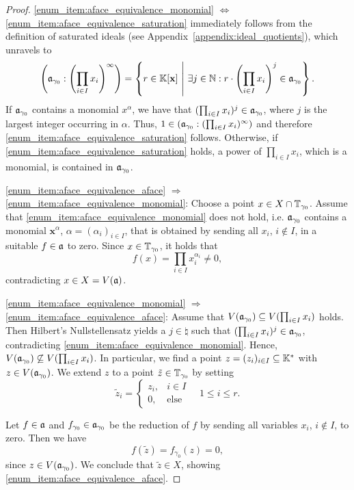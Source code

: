 \begin{proof}
	\ref{enum_item:aface_equivalence_monomial} $\Leftrightarrow$ \ref{enum_item:aface_equivalence_saturation} immediately follows from the definition of saturated ideals (see Appendix~\ref{appendix:ideal_quotients}), which unravels to
	$$\left(\mathfrak{a}_{\gamma_0} : \left(\prod_{i\in I} x_i\right)^\infty\right) = \left\{r\in \mathbb{K}[\mathbf{x}]\ \middle|\ \exists j\in\mathbb{N}: r\cdot \left(\prod_{i\in I} x_i\right)^j \in \mathfrak{a}_{\gamma_0}\right\}.$$
	If $\mathfrak{a}_{\gamma_0}$ contains a monomial $x^\alpha$, we have that $(\prod_{i\in I} x_i)^j\in\mathfrak{a}_{\gamma_0}$, where $j$ is the largest integer occurring in $\alpha$. Thus, $1\in (\mathfrak{a}_{\gamma_0} : (\prod_{i\in I} x_i)^\infty)$ and therefore \ref{enum_item:aface_equivalence_saturation} follows. Otherwise, if \ref{enum_item:aface_equivalence_saturation} holds, a power of $\prod_{i\in I} x_i$, which is a monomial, is contained in $\mathfrak{a}_{\gamma_0}$.
	
	\ref{enum_item:aface_equivalence_aface} $\Rightarrow$ 
	\ref{enum_item:aface_equivalence_monomial}: Choose a point $x\in X\cap \mathbb{T}_{\gamma_0}$. Assume that \ref{enum_item:aface_equivalence_monomial} does not hold, i.e. $\mathfrak{a}_{\gamma_0}$ contains a monomial $\mathbf{x}^\alpha$, $\alpha = (\alpha_i)_{i\in I}$, that is obtained by sending all $x_i$, $i\notin I$, in a suitable $f\in\mathfrak{a}$ to zero.
	Since $x\in\mathbb{T}_{\gamma_0}$, it holds that
	$$f(x) = \prod_{i\in I} x_i^{\alpha_i} \neq 0,$$
	contradicting $x\in X = V(\mathfrak{a})$.
	
	\ref{enum_item:aface_equivalence_monomial} $\Rightarrow$ 
	\ref{enum_item:aface_equivalence_aface}: Assume that $V(\mathfrak{a}_{\gamma_0}) \subseteq V(\prod_{i\in I} x_i)$ holds. Then Hilbert's Nullstellensatz yields a $j\in\natural$ such that $(\prod_{i\in I} x_i)^j\in\mathfrak{a}_{\gamma_0}$, contradicting \ref{enum_item:aface_equivalence_monomial}. Hence, $V(\mathfrak{a}_{\gamma_0}) \not\subseteq V(\prod_{i\in I} x_i)$. In particular, we find a point $z = (z_i)_{i\in I} \subseteq \mathbb{K}^*$ with $z\in V(\mathfrak{a}_{\gamma_0})$. We extend $z$ to a point $\tilde{z}\in\mathbb{T}_{\gamma_0}$ by setting
	$$\tilde{z}_i = \begin{cases}
	z_i, & i\in I \\
	0, & \text{else}
	\end{cases}\quad 1\leq i \leq r.$$
	
	Let $f\in\mathfrak{a}$ and $f_{\gamma_0}\in\mathfrak{a}_{\gamma_0}$ be the reduction of $f$ by sending all variables $x_i$, $i\notin I$, to zero. Then we have
	$$f(\tilde{z}) = f_{\gamma_0}(z) = 0,$$
	since $z\in V(\mathfrak{a}_{\gamma_0})$. We conclude that $\tilde{z}\in X$, showing \ref{enum_item:aface_equivalence_aface}.
\end{proof}

